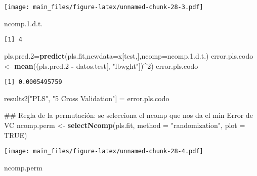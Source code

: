 \documentclass[]{article}
\newenvironment{Shaded}{\begin{snugshade}}{\end{snugshade}}
\newcommand{\KeywordTok}[1]{\textcolor[rgb]{0.13,0.29,0.53}{\textbf{#1}}}
\newcommand{\DataTypeTok}[1]{\textcolor[rgb]{0.13,0.29,0.53}{#1}}
\newcommand{\DecValTok}[1]{\textcolor[rgb]{0.00,0.00,0.81}{#1}}
\newcommand{\FloatTok}[1]{\textcolor[rgb]{0.00,0.00,0.81}{#1}}
\newcommand{\StringTok}[1]{\textcolor[rgb]{0.31,0.60,0.02}{#1}}
\newcommand{\OtherTok}[1]{\textcolor[rgb]{0.56,0.35,0.01}{#1}}
\newcommand{\OperatorTok}[1]{\textcolor[rgb]{0.81,0.36,0.00}{\textbf{#1}}}
\newcommand{\NormalTok}[1]{#1}
\begin{document}
\texttt{[image: main\_files/figure-latex/unnamed-chunk-28-3.pdf]}

\begin{Shaded}
\begin{Highlighting}[]
\NormalTok{ncomp.}\FloatTok{1.}\NormalTok{d.t.}
\end{Highlighting}
\end{Shaded}

\begin{verbatim}
[1] 4
\end{verbatim}

\begin{Shaded}
\begin{Highlighting}[]
\NormalTok{pls.pred.}\DecValTok{2}\NormalTok{=}\KeywordTok{predict}\NormalTok{(pls.fit,}\DataTypeTok{newdata=}\NormalTok{x[test,],}\DataTypeTok{ncomp=}\NormalTok{ncomp.}\FloatTok{1.}\NormalTok{d.t.)}
\NormalTok{error.pls.codo <-}\StringTok{ }\KeywordTok{mean}\NormalTok{((pls.pred.}\DecValTok{2} \OperatorTok{-}\StringTok{ }\NormalTok{datos.test[, }\StringTok{"lbwght"}\NormalTok{])}\OperatorTok{^}\DecValTok{2}\NormalTok{)}
\NormalTok{error.pls.codo}
\end{Highlighting}
\end{Shaded}

\begin{verbatim}
[1] 0.0005495759
\end{verbatim}

\begin{Shaded}
\begin{Highlighting}[]
\NormalTok{results2[}\StringTok{"PLS"}\NormalTok{, }\StringTok{"5 Cross Validation"}\NormalTok{] =}\StringTok{ }\NormalTok{error.pls.codo}

\NormalTok{## Regla de la permutación: se selecciona el ncomp que nos da el min Error de VC}
\NormalTok{ncomp.perm <-}\StringTok{ }\KeywordTok{selectNcomp}\NormalTok{(pls.fit, }\DataTypeTok{method =} \StringTok{"randomization"}\NormalTok{, }\DataTypeTok{plot =} \OtherTok{TRUE}\NormalTok{)}
\end{Highlighting}
\end{Shaded}

\texttt{[image: main\_files/figure-latex/unnamed-chunk-28-4.pdf]}

\begin{Shaded}
\begin{Highlighting}[]
\NormalTok{ncomp.perm}
\end{Highlighting}
\end{Shaded}
\end{document}
